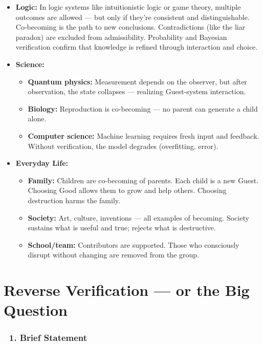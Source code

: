 \documentclass[12pt]{article}
\begin{document}
\begin{itemize}
\item \textbf{Logic:} In logic systems like intuitionistic logic or game theory, multiple outcomes are allowed — but only if they’re consistent and distinguishable. Co-becoming is the path to new conclusions. Contradictions (like the liar paradox) are excluded from admissibility. Probability and Bayesian verification confirm that knowledge is refined through interaction and choice.

\item \textbf{Science:}
\begin{itemize}
\item \textbf{Quantum physics:} Measurement depends on the observer, but after observation, the state collapses — realizing Guest-system interaction.
\item \textbf{Biology:} Reproduction is co-becoming — no parent can generate a child alone.
\item \textbf{Computer science:} Machine learning requires fresh input and feedback. Without verification, the model degrades (overfitting, error).
\end{itemize}

\item \textbf{Everyday Life:}
\begin{itemize}
\item \textbf{Family:} Children are co-becoming of parents. Each child is a new Guest. Choosing Good allows them to grow and help others. Choosing destruction harms the family.
\item \textbf{Society:} Art, culture, inventions — all examples of becoming. Society sustains what is useful and true; rejects what is destructive.
\item \textbf{School/team:} Contributors are supported. Those who consciously disrupt without changing are removed from the group.
\end{itemize}
\end{itemize}


\section*{\text{[25]} Reverse Verification — or the Big Question}

\subsubsection*{🔹 1. Brief Statement}
\end{document}
